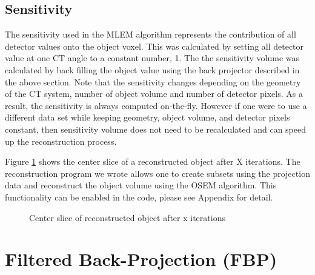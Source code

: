 \subsection{Sensitivity}
The sensitivity used in the MLEM algorithm represents the contribution of all detector values onto the object voxel.  This was calculated by setting all detector value at one CT angle to a constant number, 1.  The the sensitivity volume was calculated by back filling the object value using the back projector described in the above section.  Note that the sensitivity changes depending on the geometry of the CT system, number of object volume and number of detector pixels.  As a result, the sensitivity is always computed on-the-fly.  However if one were to use a different data set while keeping geometry, object volume, and detector pixels constant, then sensitivity volume does not need to be recalculated and can speed up the reconstruction process.

Figure \ref{fig:reconstructedimage} shows the center slice of a reconstructed object after X iterations.  The reconstruction program we wrote allows one to create subsets using the projection data and reconstruct the object volume using the OSEM algorithm.  This functionality can be enabled in the code, please see Appendix for detail.

\begin{figure}
\centering
{}
\label{fig:reconstructedimage}
\caption{Center slice of reconstructed object after x iterations}
\end{figure}

\section{Filtered Back-Projection (FBP) }



